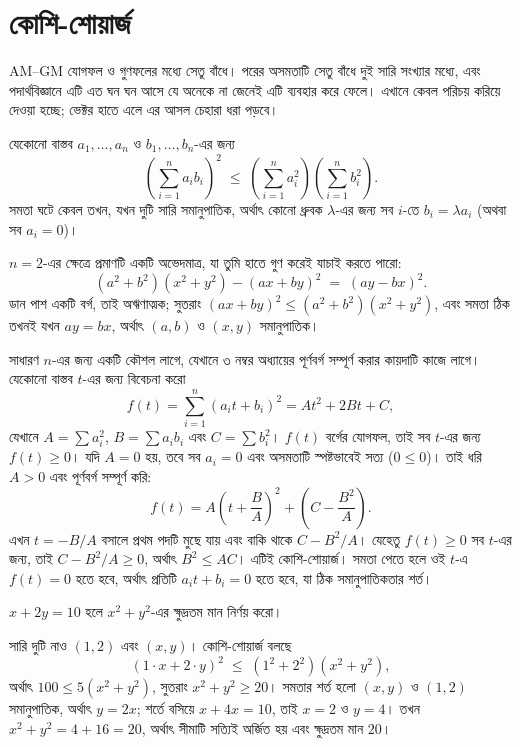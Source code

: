\documentclass[11pt]{article}
\begin{document}
\section{কোশি-শোয়ার্জ}

AM--GM যোগফল ও গুণফলের মধ্যে সেতু বাঁধে। পরের অসমতাটি সেতু বাঁধে দুই সারি
সংখ্যার মধ্যে, এবং পদার্থবিজ্ঞানে এটি এত ঘন ঘন আসে যে অনেকে না জেনেই এটি ব্যবহার
করে ফেলে। এখানে কেবল পরিচয় করিয়ে দেওয়া হচ্ছে; ভেক্টর হাতে এলে এর আসল চেহারা
ধরা পড়বে।

\begin{idea}[কোশি-শোয়ার্জ অসমতা]
যেকোনো বাস্তব $a_1, \dots, a_n$ ও $b_1, \dots, b_n$-এর জন্য
\[
  \left( \sum_{i=1}^{n} a_i b_i \right)^{2}
  \;\leq\; \left( \sum_{i=1}^{n} a_i^2 \right)
           \left( \sum_{i=1}^{n} b_i^2 \right) .
\]
সমতা ঘটে কেবল তখন, যখন দুটি সারি সমানুপাতিক, অর্থাৎ কোনো ধ্রুবক $\lambda$-এর
জন্য সব $i$-তে $b_i = \lambda a_i$ (অথবা সব $a_i = 0$)।
\end{idea}

$n = 2$-এর ক্ষেত্রে প্রমাণটি একটি অভেদমাত্র, যা তুমি হাতে গুণ করেই যাচাই করতে
পারো:
\[
  (a^2+b^2)(x^2+y^2) - (ax+by)^2 \;=\; (ay - bx)^2 .
\]
ডান পাশ একটি বর্গ, তাই অঋণাত্মক; সুতরাং $(ax+by)^2 \leq (a^2+b^2)(x^2+y^2)$,
এবং সমতা ঠিক তখনই যখন $ay = bx$, অর্থাৎ $(a,b)$ ও $(x,y)$ সমানুপাতিক।

সাধারণ $n$-এর জন্য একটি কৌশল লাগে, যেখানে ৩ নম্বর অধ্যায়ের পূর্ণবর্গ
সম্পূর্ণ করার কায়দাটি কাজে লাগে। যেকোনো বাস্তব $t$-এর জন্য বিবেচনা করো
\[
  f(t) = \sum_{i=1}^{n} (a_i t + b_i)^2 = A t^2 + 2Bt + C ,
\]
যেখানে $A = \sum a_i^2$, $B = \sum a_i b_i$ এবং $C = \sum b_i^2$।
$f(t)$ বর্গের যোগফল, তাই সব $t$-এর জন্য $f(t) \geq 0$। যদি $A = 0$ হয়, তবে সব
$a_i = 0$ এবং অসমতাটি স্পষ্টভাবেই সত্য ($0 \leq 0$)। তাই ধরি $A > 0$ এবং পূর্ণবর্গ
সম্পূর্ণ করি:
\[
  f(t) = A\left( t + \frac{B}{A} \right)^{2} + \left( C - \frac{B^2}{A} \right) .
\]
এখন $t = -B/A$ বসালে প্রথম পদটি মুছে যায় এবং বাকি থাকে $C - B^2/A$। যেহেতু
$f(t) \geq 0$ সব $t$-এর জন্য, তাই $C - B^2/A \geq 0$, অর্থাৎ $B^2 \leq AC$।
এটিই কোশি-শোয়ার্জ। সমতা পেতে হলে ওই $t$-এ $f(t) = 0$ হতে হবে, অর্থাৎ প্রতিটি
$a_i t + b_i = 0$ হতে হবে, যা ঠিক সমানুপাতিকতার শর্ত।

\begin{example}
$x + 2y = 10$ হলে $x^2 + y^2$-এর ক্ষুদ্রতম মান নির্ণয় করো।
\end{example}

\begin{solbox}
সারি দুটি নাও $(1, 2)$ এবং $(x, y)$। কোশি-শোয়ার্জ বলছে
\[
  (1 \cdot x + 2 \cdot y)^2 \;\leq\; (1^2 + 2^2)(x^2+y^2) ,
\]
অর্থাৎ $100 \leq 5(x^2+y^2)$, সুতরাং $x^2 + y^2 \geq 20$। সমতার শর্ত হলো
$(x,y)$ ও $(1,2)$ সমানুপাতিক, অর্থাৎ $y = 2x$; শর্তে বসিয়ে $x + 4x = 10$, তাই
$x = 2$ ও $y = 4$। তখন $x^2+y^2 = 4 + 16 = 20$, অর্থাৎ সীমাটি সত্যিই অর্জিত হয়
এবং ক্ষুদ্রতম মান $20$।
\end{solbox}
\end{document}
